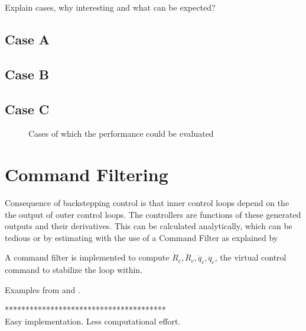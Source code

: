 Explain cases, why interesting and what can be expected?\\

\subsection{Case A}
\subsection{Case B}
\subsection{Case C}

\begin{figure}[h!]
	\centering
	\caption{Cases of which the performance could be evaluated \label{fig:routes}}
\end{figure}

\section{Command Filtering}
Consequence of backstepping control is that inner control loops depend on the the output of outer control loops. The controllers are functions of these generated outputs and their derivatives. This can be calculated analytically, which can be tedious or by estimating with the use of a Command Filter as explained by \cite{Djapic} 

A command filter is implemented to compute $ \dot{R}_c, \ddot{R}_c,\dot{q}_c, \ddot{q}_c $, the virtual control command to stabilize the loop within. \cite{Farrell2009}

Examples from \cite{Farrell2008} and \cite{Djapic2008}. 

***************************************\\
Easy implementation. Less computational effort.

